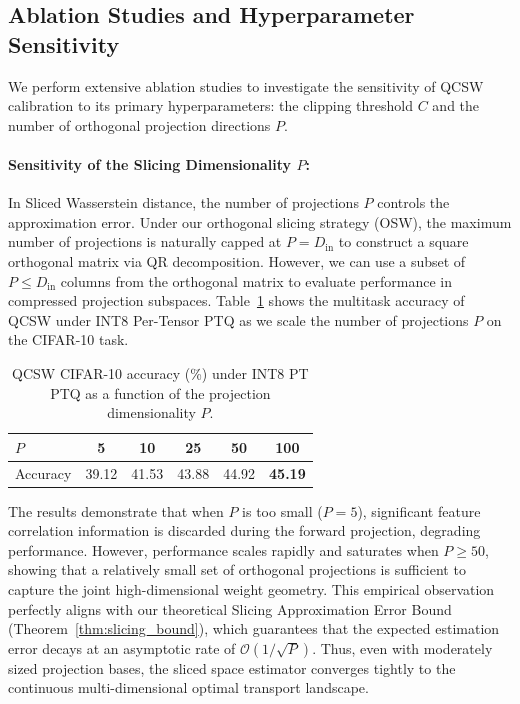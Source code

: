 \documentclass{article}
\theoremstyle{plain}
\theoremstyle{definition}
\theoremstyle{remark}
\begin{document}
\subsection{Ablation Studies and Hyperparameter Sensitivity}

We perform extensive ablation studies to investigate the sensitivity of QCSW calibration to its primary hyperparameters: the clipping threshold $C$ and the number of orthogonal projection directions $P$.

\paragraph{Sensitivity of the Slicing Dimensionality $P$:}
In Sliced Wasserstein distance, the number of projections $P$ controls the approximation error. Under our orthogonal slicing strategy (OSW), the maximum number of projections is naturally capped at $P = D_{\text{in}}$ to construct a square orthogonal matrix via QR decomposition. However, we can use a subset of $P \le D_{\text{in}}$ columns from the orthogonal matrix to evaluate performance in compressed projection subspaces. Table~\ref{tab:ablation_p} shows the multitask accuracy of QCSW under INT8 Per-Tensor PTQ as we scale the number of projections $P$ on the CIFAR-10 task.

\begin{table}[h]
\caption{QCSW CIFAR-10 accuracy (\%) under INT8 PT PTQ as a function of the projection dimensionality $P$.}
\label{tab:ablation_p}
\vskip 0.15in
\begin{center}
\begin{small}
\begin{sc}
\setlength{\tabcolsep}{3pt}
\begin{tabular}{lccccc}
\toprule
$P$ & 5 & 10 & 25 & 50 & 100 \\
\midrule
Accuracy & 39.12 & 41.53 & 43.88 & 44.92 & \textbf{45.19} \\
\bottomrule
\end{tabular}
\end{sc}
\end{small}
\end{center}
\vskip -0.1in
\end{table}

The results demonstrate that when $P$ is too small ($P=5$), significant feature correlation information is discarded during the forward projection, degrading performance. However, performance scales rapidly and saturates when $P \ge 50$, showing that a relatively small set of orthogonal projections is sufficient to capture the joint high-dimensional weight geometry. This empirical observation perfectly aligns with our theoretical Slicing Approximation Error Bound (Theorem~\ref{thm:slicing_bound}), which guarantees that the expected estimation error decays at an asymptotic rate of $\mathcal{O}(1/\sqrt{P})$. Thus, even with moderately sized projection bases, the sliced space estimator converges tightly to the continuous multi-dimensional optimal transport landscape.
\end{document}
